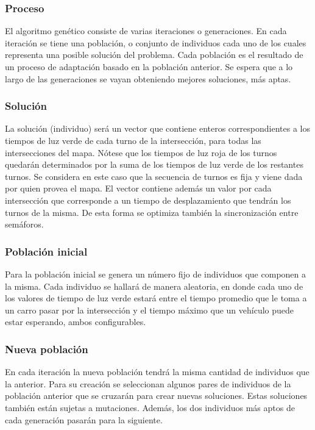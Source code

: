 \documentclass[colorinlistoftodos,twoside,twocolumn]{article} %
\begin{document}
	\subsubsection{Proceso}
	
	El algoritmo gen\'etico consiste de varias iteraciones o generaciones. En cada iteraci\'on se tiene una poblaci\'on, o conjunto de individuos cada uno de los cuales representa una posible soluci\'on del problema. Cada poblaci\'on es el resultado de un proceso de adaptaci\'on basado en la poblaci\'on anterior. Se espera que a lo largo de las generaciones se vayan obteniendo mejores soluciones, m\'as aptas.
	
	\subsubsection{Solución}
	
	La solución (individuo) será un vector que contiene enteros correspondientes a los tiempos de luz verde de cada turno de la intersección, para todas las intersecciones del mapa. N\'otese que los tiempos de luz roja de los turnos quedar\'an determinados por la suma de los tiempos de luz verde de los restantes turnos. Se considera en este caso que la secuencia de turnos es fija y viene dada por quien provea el mapa. El vector contiene adem\'as un valor por cada intersecci\'on que corresponde a un tiempo de desplazamiento que tendr\'an los turnos de la misma. De esta forma se optimiza tambi\'en la sincronizaci\'on entre sem\'aforos. 
	
	\subsubsection{Población inicial}
	
	Para  la población inicial se genera un n\'umero fijo de individuos que componen a la misma. Cada individuo se hallará de manera aleatoria, en donde cada uno de los valores de tiempo de luz verde estará entre el tiempo promedio que le toma a un carro pasar por la intersección y el tiempo máximo que un vehículo puede estar esperando, ambos configurables. 
	
	\subsubsection{Nueva población}
	En cada iteraci\'on la nueva poblaci\'on tendr\'a la misma cantidad de individuos que la anterior. Para su creaci\'on se seleccionan algunos pares de individuos de la poblaci\'on anterior que se cruzar\'an para crear nuevas soluciones. Estas soluciones tambi\'en est\'an sujetas a mutaciones. Adem\'as, los dos individuos m\'as aptos de cada generaci\'on pasar\'an para la siguiente.   
	
\end{document}
